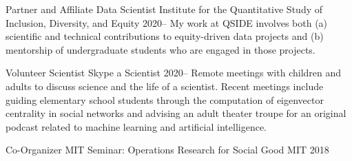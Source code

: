 

\begin{cventries}

\cventry
    {Partner and Affiliate Data Scientist} %
    {Institute for the Quantitative Study of Inclusion, Diversity, and Equity } %
    {} %
    {2020--} %
    {My work at QSIDE involves both (a) scientific and technical contributions to equity-driven data projects and (b) mentorship of undergraduate students who are engaged in those projects.}

\cventry
    {Volunteer Scientist} %
    {Skype a Scientist} %
    {} %
    {2020--} %
    {Remote meetings with children and adults to discuss science and the life of a scientist. 
    Recent meetings include guiding elementary school students through the computation of eigenvector centrality in social networks and advising an adult theater troupe for an original podcast related to machine learning and artificial intelligence.}

\cventry
    {Co-Organizer} %
    {MIT Seminar: Operations Research for Social Good} %
    {MIT} %
    {2018 } %
    {}
\end{cventries}



